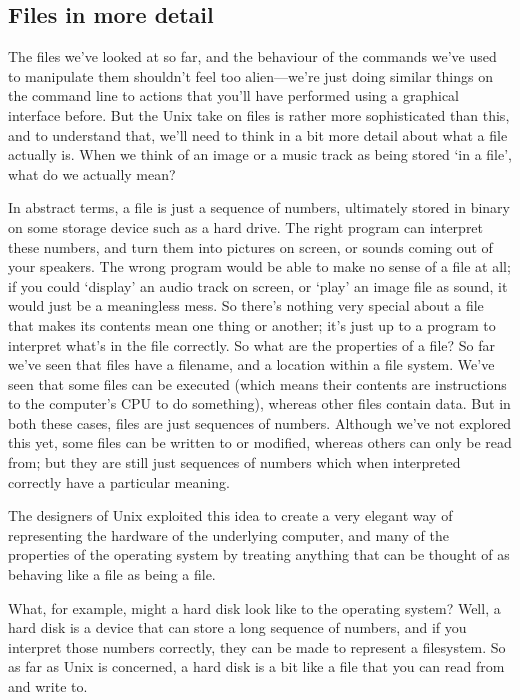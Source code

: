 \subsection{Files in more detail}

The files we've looked at so far, and the behaviour of the commands we've used to manipulate them shouldn't feel too alien---we're just doing similar things on the command line to actions that you'll have performed using a graphical interface before. But the Unix take on files is rather more sophisticated than this, and to understand that, we'll need to think in a bit more detail about what a file actually is. When we think of an image or a music track as being stored `in a file', what do we actually mean? 

In abstract terms, a file is just a sequence of numbers, ultimately stored in binary on some storage device such as a hard drive. The right program can interpret these numbers, and turn them into pictures on screen, or sounds coming out of your speakers. The wrong program would be able to make no sense of a file at all; if you could `display' an audio track on screen, or `play' an image file as sound, it would just be a meaningless mess. So there's nothing very special about a file that makes its contents mean one thing or another; it's just up to a program to interpret what's in the file correctly. So what are the properties of a file? So far we've seen that files have a filename, and a location within a file system. We've seen that some files can be executed (which means their contents are instructions to the computer's CPU to do something), whereas other files contain data. But in both these cases, files are just sequences of numbers. Although we've not explored this yet, some files can be written to or modified, whereas others can only be read from; but they are still just sequences of numbers which when interpreted correctly have a particular meaning. 

The designers of Unix exploited this idea to create a very elegant way of representing the hardware of the underlying computer, and many of the properties of the operating system by treating anything that can be thought of as behaving like a file as being a file. 

What, for example, might a hard disk look like to the operating system? Well, a hard disk is a device that can store a long sequence of numbers, and if you interpret those numbers correctly, they can be made to represent a filesystem. So as far as Unix is concerned, a hard disk is a bit like a file that you can read from and write to. 

